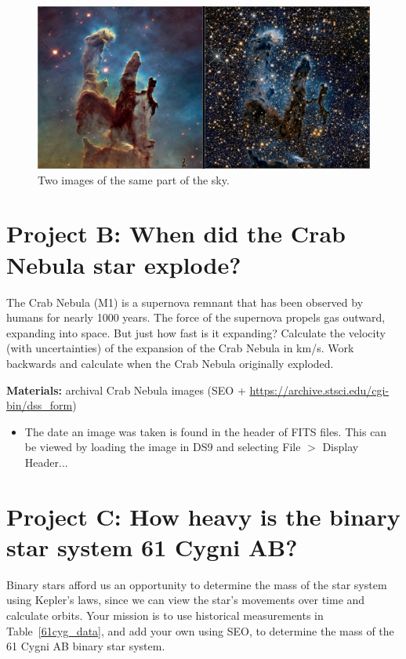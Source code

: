 \begin{figure}
	\centering
	\includegraphics[width=\textwidth]{stars-project/heic1501c-crop}
	\caption{Two images of the same part of the sky.}\label{sp:fig:pillars}
\end{figure}

\section{Project B: When did the Crab Nebula star explode?}

The Crab Nebula (M1) is a supernova remnant that has been observed by humans for nearly 1000 years. The force of the supernova propels gas outward, expanding into space. But just how fast is it expanding? Calculate the velocity (with uncertainties) of the expansion of the Crab Nebula in km/s. Work backwards and calculate when the Crab Nebula originally exploded.

\textbf{Materials:} archival Crab Nebula images (SEO + \url{https://archive.stsci.edu/cgi-bin/dss_form})

\begin{itemize}
	\item The date an image was taken is found in the header of FITS files. This can be viewed by loading the image in DS9 and selecting File $>$ Display Header...
\end{itemize}

\section{Project C: How heavy is the binary star system 61 Cygni AB?}

Binary stars afford us an opportunity to determine the mass of the star system using Kepler's laws, since we can view the star's movements over time and calculate orbits. Your mission is to use historical measurements in Table\ \ref{61cyg_data}, and add your own using SEO, to determine the mass of the 61 Cygni AB binary star system.

